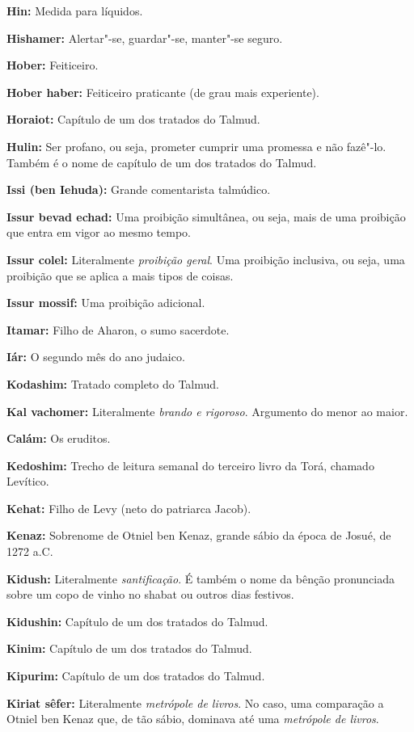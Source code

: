 \begin{hangparas}{.25in}{1}
{\textbf{Hin:} Medida para líquidos.

\textbf{Hishamer:} Alertar"-se, guardar"-se, manter"-se seguro.

\textbf{Hober:} Feiticeiro.

\textbf{Hober haber:} Feiticeiro praticante (de grau mais experiente).

\textbf{Horaiot:} Capítulo de um dos tratados do Talmud.

\textbf{Hulin:} Ser profano, ou seja, prometer cumprir uma promessa e
não fazê"-lo. Também é o nome de capítulo de um dos tratados do Talmud.

\textbf{Issi (ben Iehuda):} Grande comentarista talmúdico.

\textbf{Issur bevad echad:} Uma proibição simultânea, ou seja, mais de uma proibição que entra em vigor ao mesmo tempo.

\textbf{Issur colel:} Literalmente \emph{proibição geral}. Uma proibição inclusiva, ou seja, uma proibição que se aplica a mais tipos de coisas.

\textbf{Issur mossif:} Uma proibição adicional.

\textbf{Itamar:} Filho de Aharon, o sumo sacerdote.

\textbf{Iár:} O segundo mês do ano judaico.

\textbf{Kodashim:} Tratado completo do Talmud.

\textbf{Kal vachomer:} Literalmente \emph{brando e rigoroso}. Argumento do menor ao maior.

\textbf{Calám:} Os eruditos.

\textbf{Kedoshim:} Trecho de leitura semanal do terceiro livro
da Torá, chamado Levítico.

\textbf{Kehat:} Filho de Levy (neto do patriarca Jacob).

\textbf{Kenaz:} Sobrenome de Otniel ben Kenaz, grande sábio da época de Josué, de
1272 a.C.

\textbf{Kidush:} Literalmente \emph{santificação}. É também o nome da bênção 
pronunciada sobre um copo de vinho no shabat ou outros dias festivos.

\textbf{Kidushin:} Capítulo de um dos tratados do Talmud.

\textbf{Kinim:} Capítulo de um dos tratados do Talmud.

\textbf{Kipurim:} Capítulo de um dos tratados do Talmud.

\textbf{Kiriat sêfer:} Literalmente \emph{metrópole de livros}. No caso, 
uma comparação a Otniel ben Kenaz que, de tão sábio, dominava até 
uma \emph{metrópole de livros}.

}
\end{hangparas}
